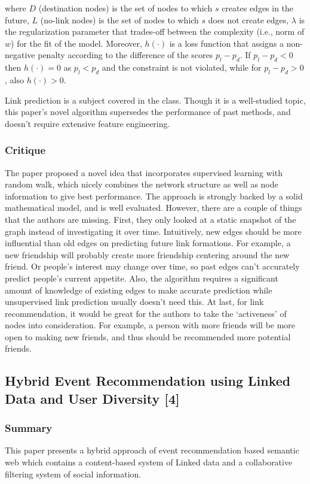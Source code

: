 \documentclass{article}
\begin{document}
where $D$ (destination nodes) is the set of nodes to which $s$ creates edges in the future, $L$ (no-link nodes) is the set of nodes to which $s$ does not create edges, $λ$ is the regularization parameter that trades-off between the complexity (i.e., norm of $w$) for the fit of the model. Moreover, $h(\cdot)$ is a loss function that assigns a non-negative penalty according to the difference of the scores $p_l - p_d$. If $p_l - p_d<0$ then $h(\cdot)=0$ as $p_l <p_d$ and the constraint is not violated, while for $p_l - p_d > 0$, also $h(\cdot) > 0$.

Link prediction is a subject covered in the class. Though it is a well-studied topic, this paper’s novel algorithm supersedes the performance of past methods, and doesn’t require extensive feature engineering. 

\subsubsection{Critique}
The paper proposed a novel idea that incorporates supervised learning with random walk, which nicely combines the network structure as well as node information to give best performance. The approach is strongly backed by a solid mathematical model, and is well evaluated. However, there are a couple of things that the authors are missing. First, they only looked at a static snapshot of the graph instead of investigating it over time. Intuitively, new edges should be more influential than old edges on predicting future link formations. For example, a new friendship will probably create more friendship centering around the new friend. Or people’s interest may change over time, so past edges can’t accurately predict people’s current appetite. Also, the algorithm requires a significant amount of knowledge of existing edges to make accurate prediction while unsupervised link prediction usually doesn’t need this. At last, for link recommendation, it would be great for the authors to take the ‘activeness’ of nodes into consideration. For example, a person with more friends will be more open to making new friends, and thus should be recommended more potential friends.

\subsection{Hybrid Event Recommendation using Linked Data and User Diversity [4]}
\subsubsection{Summary}
This paper presents a hybrid approach of event recommendation based semantic web which contains a content-based system of Linked data and a collaborative filtering system of social information.
\end{document}
